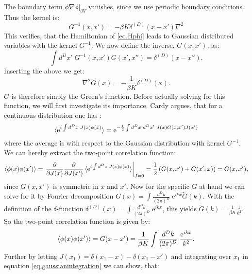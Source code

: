 The boundary term $\left.\phi\nabla\phi\right|_{\partial V}$ vanishes, since we use periodic boundary conditions. Thus the kernel is: 
\begin{equation}
G^{-1}(x,x') = -\beta K \delta^{(D)}(x - x')\nabla^2 \nonumber
\end{equation}
This verifies, that the Hamiltonian of \eqref{eq.Hphi} leads to Gaussian distributed variables with the kernel $G^{-1}$. We now define the inverse, $G(x,x')$, as:
\begin{equation}
\int d^{D}x' \; G^{-1}(x,x')G(x',x'') = \delta^{(D)}(x - x''). \nonumber
\end{equation}
Inserting the above we get:
\begin{equation}
\nabla^2G(x) = -\frac{1}{\beta K} \delta^{(D)}(x). \nonumber
\end{equation}
$G$ is therefore simply the Green's function. Before actually solving for this function, we will first investigate its importance. Cardy argues, that for a continuous distribution one has \cite[p. 227]{Cardy.StatPhys}: 
\begin{equation}
\braket{\text{e}^{i\int d^{D}x\; J(x) \phi(x)}} = \text{e}^{ -\frac{1}{2}\int d^{D}x\; d^{D}x'\; J(x) G(x,x') J(x')  }
\label{eq.gaussianintegration}
\end{equation}
where the average is with respect to the Gaussian distribution with kernel $G^{-1}$. We can hereby extract the two-point correlation function:
\begin{equation}
\braket{\phi(x)\phi(x')} = \left. \frac{\partial}{\partial J(x)}\frac{\partial}{\partial J(x')} \braket{\text{e}^{i\int d^{D}x\; J(x) \phi(x)}}\right|_{J = 0} = \frac{1}{2}\left(G(x, x') + G(x', x)\right) = G(x, x'), \nonumber
\end{equation} 
since $G(x,x')$ is symmetric in $x$ and $x'$. Now for the specific $G$ at hand we can solve for it by Fourier decomposition $G(x) = \int \frac{d^{D}k}{(2\pi)^D}\; \text{e}^{ikx} \tilde{G}(k)$. With the definition of the $\delta$-function $\delta^{(D)}(x) = \int \frac{d^{D}k}{(2\pi)^D}\; \text{e}^{ikx}$, this yields $\tilde{G}(k) = \frac{1}{\beta K}\frac{1}{k^2}$. So the two-point correlation function is given by: 
\begin{equation}
\braket{\phi(x)\phi(x')} = G(x - x') = \frac{1}{\beta K}\int \frac{d^{D}k}{(2\pi)^D}\; \frac{\text{e}^{ikx}}{k^2}. 
\label{eq.anglecorrelationfunction.generaldimension}
\end{equation} 
Further by letting $J(x_1) = \delta(x_1 - x) - \delta(x_1 - x')$ and integrating over $x_1$ in equation \eqref{eq.gaussianintegration} we can show, that:
